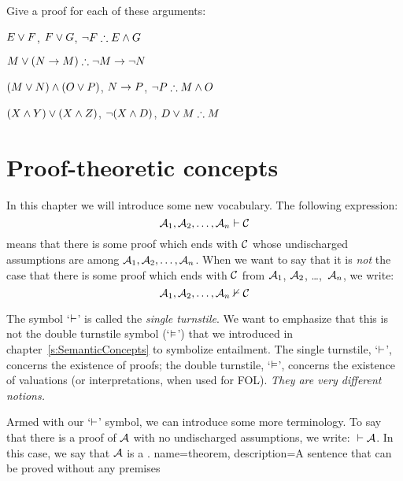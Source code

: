 \problempart 
Give a proof for each of these arguments:
\begin{earg}
\item $E\vee F$, $F\vee G$, $\enot F \therefore E \eand G$
\item $M\eor(N\eif M) \therefore \enot M \eif \enot N$
\item $(M \vee N) \wedge (O \vee P)$, $N \rightarrow P$, $\enot P \therefore M\eand O$
\item $(X\wedge Y)\vee(X\wedge Z)$, $\neg(X\wedge D)$, $D\eor M \therefore M$
\end{earg}



\chapter{Proof-theoretic concepts}\label{s:ProofTheoreticConcepts}

In this chapter we will introduce some new vocabulary. The following expression:
$$\mathcal{A}_1, \mathcal{A}_2, \ldots, \mathcal{A}_n \vdash \mathcal{C}$$
means that there is some proof which ends with $\mathcal{C}$ whose undischarged assumptions are among $\mathcal{A}_1, \mathcal{A}_2, \ldots, \mathcal{A}_n$. When we want to say that it is \emph{not} the case that there is some proof which ends with $\mathcal{C}$ from $\mathcal{A}_1$, $\mathcal{A}_2$, \dots,~$\mathcal{A}_n$, we write:  $$\mathcal{A}_1, \mathcal{A}_2, \ldots, \mathcal{A}_n \nvdash \mathcal{C}$$ 

The symbol `$\vdash$' is called the \emph{single turnstile}. We want to emphasize that this is not the {double turnstile} symbol (`$\vDash$') that we introduced in chapter~\ref{s:SemanticConcepts} to symbolize entailment. The single turnstile, `$\vdash$', concerns the existence of proofs; the double turnstile, `$\vDash$', concerns the existence of valuations (or interpretations, when used for FOL). \emph{They are very different notions.}

Armed with our `$\vdash$' symbol, we can introduce some more terminology. To say that there is a proof of $\mathcal{A}$ with no undischarged assumptions, we write: ${} \vdash \mathcal{A}$. In this case, we say that $\mathcal{A}$ is a .
{
name=theorem,
description={A sentence that can be proved without any premises}
}

